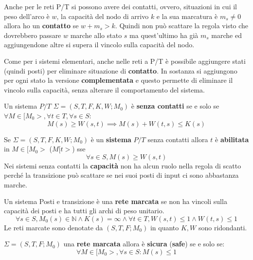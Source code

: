 Anche per le reti P/T si possono avere dei contatti, ovvero, situazioni in cui
il peso dell'arco è $w$, la capacità del nodo di arrivo $k$ e la sua marcatura è
$m_s\ne 0$ allora ho un \textbf{contatto} se $w+m_s >k$. Quindi non può scattare
la regola visto che dovrebbero passare $w$ marche allo stato $s$ ma quest'ultimo
ha già $m_s$ marche ed aggiungendone altre si supera il vincolo sulla capacità
del nodo.

Come per i sistemi elementari, anche nelle reti a P/T è possibile aggiungere stati
(quindi posti) per eliminare situazione di \textbf{contatto}. In sostanza si
aggiungono per ogni stato la versione \textbf{complementata} e questo permette
di eliminare il vincolo sulla capacità, senza alterare il comportamento del sistema.
\begin{definizione}
    Un sistema $P/T$ $\Sigma = (S,T,F,K,W;M_0)$ è \textbf{senza contatti} se e
    solo se $\forall M\in [M_0>,\forall t\in T, \forall s\in S$:
    \begin{equation}
        M(s)\ge W(s,t)\implies M(s)+W(t,s)\le K(s)
    \end{equation}
\end{definizione}
Se $\Sigma = (S,T,F,K,W;M_0)$ è un \textbf{sistema} $P/T$ senza contatti allora
$t$ è \textbf{abilitata} in $M\in [M_0>$ ($M[t>$) sse
\begin{equation}
    \forall s\in S, M(s)\ge W(s,t)
\end{equation}
Nei sistemi senza contatti la \textbf{capacità} non ha alcun ruolo nella regola
di scatto perché la transizione può scattare se nei suoi posti di input ci sono
abbastanza marche.
\begin{definizione}
    Un sistema Posti e transizione è una \textbf{rete marcata} se non ha vincoli
    sulla capacità dei posti e ha tutti gli archi di peso unitario.
    \begin{equation}
        \forall s\in S, M_0(s)\in \mathbb{N}\land K(s)=\infty \land \forall t\in
        T, W(s,t)\le 1\land W(t,s)\le 1
    \end{equation}
    Le reti marcate sono denotate da $(S,T,F;M_0)$ in quanto $K,W$ sono ridondanti.
\end{definizione}
\begin{definizione} 
    $\Sigma = (S,T,F;M_0)$ una \textbf{rete marcata} allora è \textbf{sicura}
    (\textbf{safe}) se e solo se:
    \begin{equation}
        \forall M\in [M_0>,\forall s\in S:M(s)\le1
    \end{equation}
\end{definizione}
